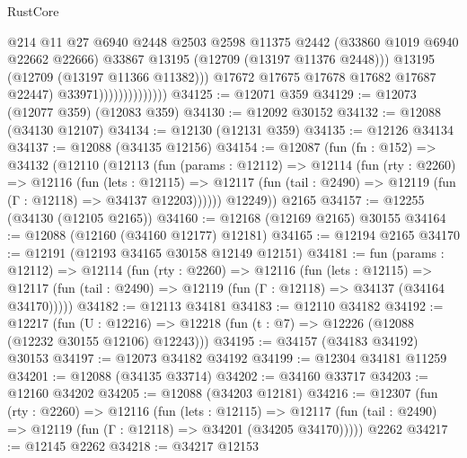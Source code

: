 \begin{lexlean}{RustCore}
\begin{coremodule}
                                      @214
                                      @11
                                      @27
                                      @6940
                                      @2448
                                      @2503
                                      @2598
                                      @11375
                                      @2442
                                      (@33860 @1019 @6940 @22662 @22666)
                                      @33867
                                      @13195
                                      (@12709 (@13197 @11376 @2448)))
                                    @13195
                                    (@12709 (@13197 @11366 @11382)))
                                  @17672
                                  @17675
                                  @17678
                                  @17682
                                  @17687
                                  @22447)
                                @33971))))))))))))))
@34125 := @12071 @359
@34129 := @12073 (@12077 @359) (@12083 @359)
@34130 := @12092 @30152
@34132 := @12088 (@34130 @12107)
@34134 := @12130 (@12131 @359)
@34135 := @12126 @34134
@34137 := @12088 (@34135 @12156)
@34154 := @12087
    (fun (fn : @152) =>
    @34132
      (@12110
        (@12113
          (fun (params : @12112) =>
          @12114
            (fun (rty : @2260) =>
            @12116
              (fun (lets : @12115) =>
              @12117 (fun (tail : @2490) => @12119 (fun (Γ : @12118) => @34137 @12203))))))
        @12249))
    @2165
@34157 := @12255 (@34130 (@12105 @2165))
@34160 := @12168 (@12169 @2165) @30155
@34164 := @12088 (@12160 (@34160 @12177) @12181)
@34165 := @12194 @2165
@34170 := @12191 (@12193 @34165 @30158 @12149 @12151)
@34181 := fun (params : @12112) =>
  @12114
    (fun (rty : @2260) =>
    @12116
      (fun (lets : @12115) =>
      @12117 (fun (tail : @2490) => @12119 (fun (Γ : @12118) => @34137 (@34164 @34170)))))
@34182 := @12113 @34181
@34183 := @12110 @34182
@34192 := @12217
    (fun (U : @12216) => @12218 (fun (t : @7) => @12226 (@12088 (@12232 @30155 @12106) @12243)))
@34195 := @34157 (@34183 @34192) @30153
@34197 := @12073 @34182 @34192
@34199 := @12304 @34181 @11259
@34201 := @12088 (@34135 @33714)
@34202 := @34160 @33717
@34203 := @12160 @34202
@34205 := @12088 (@34203 @12181)
@34216 := @12307
    (fun (rty : @2260) =>
    @12116
      (fun (lets : @12115) =>
      @12117 (fun (tail : @2490) => @12119 (fun (Γ : @12118) => @34201 (@34205 @34170)))))
    @2262
@34217 := @12145 @2262
@34218 := @34217 @12153

\end{coremodule}
\end{lexlean}

